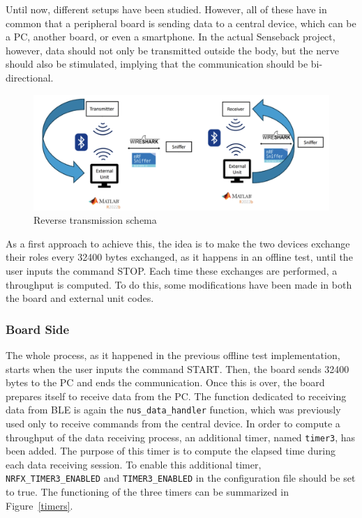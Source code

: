 \documentclass{Configuration_Files/PoliMi3i_thesis}
\begin{document}
Until now, different setups have been studied. However, all of these have in common that a peripheral board is sending data to a central device, which can be a PC, another board, or even a smartphone. In the actual Senseback project, however, data should not only be transmitted outside the body, but the nerve should also be stimulated, implying that the communication should be bi-directional.

\begin{figure}[H]
    \centering
    \includegraphics[scale=0.6]{Board Windows PC/9.png}
    \caption{Reverse transmission schema}
    \label{boardwindows_9}
\end{figure}

As a first approach to achieve this, the idea is to make the two devices exchange their roles every 32400 bytes exchanged, as it happens in an offline test, until the user inputs the command STOP. Each time these exchanges are performed, a throughput is computed. To do this, some modifications have been made in both the board and external unit codes.

\subsubsection{Board Side}

The whole process, as it happened in the previous offline test implementation, starts when the user inputs the command START. Then, the board sends 32400 bytes to the PC and ends the communication. Once this is over, the board prepares itself to receive data from the PC. The function dedicated to receiving data from BLE is again the \texttt{nus\_data\_handler} function, which was previously used only to receive commands from the central device. In order to compute a throughput of the data receiving process, an additional timer, named \texttt{timer3}, has been added. The purpose of this timer is to compute the elapsed time during each data receiving session. To enable this additional timer, \texttt{NRFX\_TIMER3\_ENABLED} and \texttt{TIMER3\_ENABLED} in the configuration file should be set to true. The functioning of the three timers can be summarized in Figure~\ref{timers}.
\end{document}

